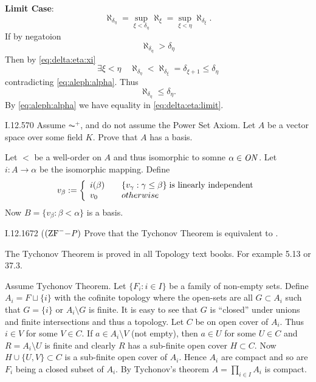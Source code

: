 \textbf{Limit Case}:
\begin{equation*} \label{eq:delta:eta:xi}
\aleph_{\delta_\eta}
  = \sup_{\xi < \delta_\eta} \aleph_\xi
  = \sup_{\xi < \eta} \aleph_{\delta_\xi}.
\end{equation*}
If by negatoion
\begin{equation*}
\aleph_{\delta_\eta} > \delta_\eta
\end{equation*}
Then by \eqref{eq:delta:eta:xi}
\begin{equation*}
\exists \xi < \eta \quad
 \aleph_{\delta_\eta} < \aleph_{\delta_\xi} = \delta_{\xi + 1} \leq \delta_\eta
\end{equation*}
contradicting \eqref{eq:aleph:alpha}.
Thus
\begin{equation*} \label{eq:delta:eta:limit}
\aleph_{\delta_\eta} \leq \delta_\eta.
\end{equation*}
By \eqref{eq:aleph:alpha} we have equality in \eqref{eq:delta:eta:limit}.

\begin{lexcopy}{I.12.5}{70}
Assume \(\AC^+\), and do not assume the Power Set Axiom. Let
$A$ be a vector space over some field $K$. Prove that $A$ has a basis.
\end{lexcopy}

Let \(<\) be a well-order on $A$ and thus isomorphic to somne \(\alpha\in\mathit{ON}\).
Let \(i:A\to\alpha\) be the isomorphic mapping.
Define
\begin{equation*}
v_\beta :=
\left\{
 \begin{array}{ll}
 i(\beta) \quad & \{v_\gamma: \gamma \leq \beta\} \;
          \textnormal{is linearly independent}\\
 v_0 \quad & otherwise
 \end{array}
\right.
\end{equation*}
Now \(B=\{v_\beta: \beta < \alpha\}\) is a basis.

\begin{lexcopy}{I.12.16}{72}
(\((\textnormal{ZF}^- \mathit{-P})\)
Prove that the Tychonov Theorem is equivalent to \AC.
\end{lexcopy}

The Tychonov Theorem is proved in all Topology text books.
For example \cite{Kelley2017general} 5.13
or \cite{munkres2000topology} 37.3.

Assume Tychonov Theorem. Let \(\{F_i: i\in I\}\) be a family
of non-empty sets. Define \(A_i = F \sqcup\{i\}\)
with the cofinite topology where the open-sets are
all \(G \subset A_i\) such that \(G=\{i\}\) or \(A_i \setminus G\) is finite.
It is easy to see that $G$ is ``closed'' under unions and finite intersections
and thus a topology. Let $C$ be on open cover of \(A_i\).
Thus \(i\in V\) for some \(V \in C\).
If \(a \in A_i \setminus V\) (not empty), then
\(a \in U\) for some \(U \in C\) and \(R = A_i \setminus U\) is finite
and clearly $R$ has a sub-finite open cover \(H \subset C\).
Now \(H \cup \{U, V\} \subset C\) is a sub-finite open cover of \(A_i\).
Hence \(A_i\) are compact and so are \(F_i\) being a closed subset of \(A_i\).
By Tychonov's theorem \(A = \prod_{i\in I} A_i\) is compact.

